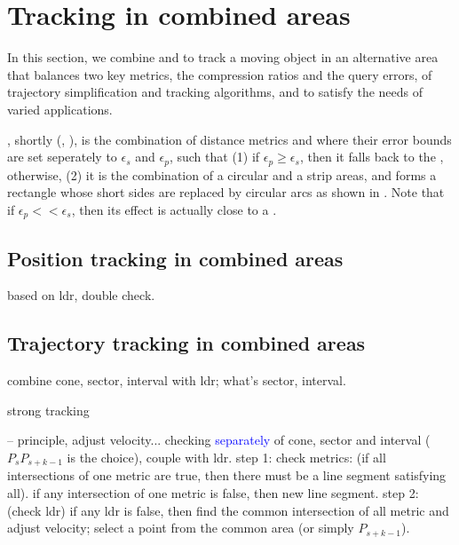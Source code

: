 

\section{Tracking in combined areas}
\label{sec:combine}

In this section, we combine \sed and \ped to track a moving object in an alternative area that balances two key metrics, \ie the compression ratios and the query errors, of trajectory simplification and tracking algorithms, and to satisfy the needs of varied applications.


, shortly \bed (\sed, \ped), is the combination of distance metrics \sed and \ped where their error bounds are set seperately to $\epsilon_s$ and $\epsilon_p$, such that (1) if $\epsilon_p \ge \epsilon_s$, then it falls back to the \sed, otherwise, (2) it is the combination of a circular and a strip areas, and forms a rectangle whose short sides are replaced by circular arcs as shown in . Note that if $\epsilon_p << \epsilon_s$, then its effect is actually close to a \ped.

\subsection{Position tracking in combined areas}
based on ldr, double check.


\subsection{Trajectory tracking in combined areas}

combine cone, sector, interval with ldr; what's sector, interval.


strong tracking

-- principle, adjust velocity...
	checking \textcolor{blue}{separately} of cone, sector and interval ($P_sP_{s+k-1}$ is the choice), couple with ldr.
	step 1: check metrics: (if all intersections of one metric are true, then there must be a line segment satisfying all).
	if any intersection of one metric is false, then new line segment.
	step 2:	(check ldr) if any ldr is false, then find the common intersection of all metric and adjust velocity; select a point from the common area (or simply $P_{s+k-1}$).

